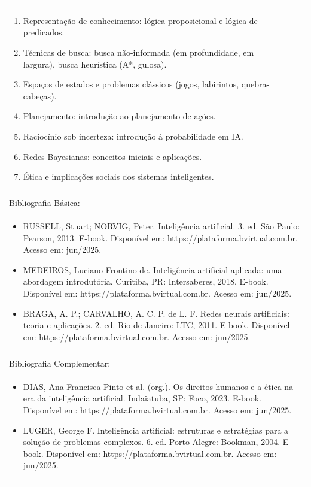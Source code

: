 \documentclass[11pt]{article}
\begin{document}
\begin{center}
\begin{longtable}{|p{4cm}|p{4cm}|p{4cm}|p{4cm}|}
{\begin{enumerate}
\item Representação de conhecimento: lógica proposicional e lógica de predicados.
\item Técnicas de busca: busca não-informada (em profundidade, em largura), busca heurística (A*, gulosa).
\item Espaços de estados e problemas clássicos (jogos, labirintos, quebra-cabeças).
\item Planejamento: introdução ao planejamento de ações.
\item Raciocínio sob incerteza: introdução à probabilidade em IA.
\item Redes Bayesianas: conceitos iniciais e aplicações.
\item Ética e implicações sociais dos sistemas inteligentes.\end{enumerate}}\\
\multicolumn{4}{|p{16cm}|}{}\\
\hline
\multicolumn{4}{|p{16cm}|}{Bibliografia Básica:}\\
\multicolumn{4}{|p{16cm}|}{%
\begin{itemize}\item RUSSELL, Stuart; NORVIG, Peter. Inteligência artificial. 3. ed. São Paulo: Pearson, 2013. E-book. Disponível em: https://plataforma.bvirtual.com.br. Acesso em: jun/2025.
\item MEDEIROS, Luciano Frontino de. Inteligência artificial aplicada: uma abordagem introdutória. Curitiba, PR: Intersaberes, 2018. E-book. Disponível em: https://plataforma.bvirtual.com.br. Acesso em: jun/2025.
\item BRAGA, A. P.; CARVALHO, A. C. P. de L. F. Redes neurais artificiais: teoria e aplicações. 2. ed. Rio de Janeiro: LTC, 2011. E-book. Disponível em: https://plataforma.bvirtual.com.br. Acesso em: jun/2025.\end{itemize}}\\
\multicolumn{4}{|p{16cm}|}{}\\
\hline
\multicolumn{4}{|p{16cm}|}{Bibliografia Complementar:}\\
\multicolumn{4}{|p{16cm}|}{%
\begin{itemize}\item DIAS, Ana Francisca Pinto et al. (org.). Os direitos humanos e a ética na era da inteligência artificial. Indaiatuba, SP: Foco, 2023. E-book. Disponível em: https://plataforma.bvirtual.com.br. Acesso em: jun/2025.
\item LUGER, George F. Inteligência artificial: estruturas e estratégias para a solução de problemas complexos. 6. ed. Porto Alegre: Bookman, 2004. E-book. Disponível em: https://plataforma.bvirtual.com.br. Acesso em: jun/2025.

\end{itemize}}
\end{longtable}
\end{center}
\end{document}
